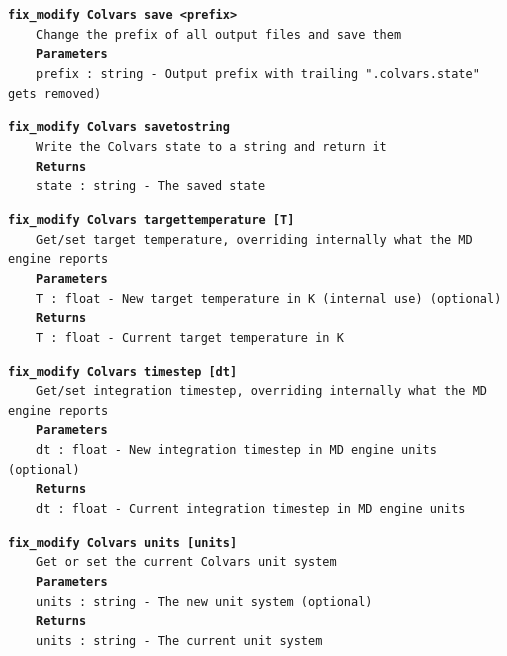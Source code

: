 \begin{mdexampleinput}{}
\texttt{\textbf{fix\_modify Colvars save <prefix>}}
\\
\-~~~~\texttt{Change the prefix of all output files and save them}
\\
\-~~~~\texttt{\textbf{Parameters}}
\\
\-~~~~\texttt{prefix : string - Output prefix with trailing ".colvars.state" gets removed)}
\end{mdexampleinput}
\begin{mdexampleinput}{}
\texttt{\textbf{fix\_modify Colvars savetostring}}
\\
\-~~~~\texttt{Write the Colvars state to a string and return it}
\\
\-~~~~\texttt{\textbf{Returns}}
\\
\-~~~~\texttt{state : string - The saved state}
\end{mdexampleinput}
\begin{mdexampleinput}{}
\texttt{\textbf{fix\_modify Colvars targettemperature [T]}}
\\
\-~~~~\texttt{Get/set target temperature, overriding internally what the MD engine reports}
\\
\-~~~~\texttt{\textbf{Parameters}}
\\
\-~~~~\texttt{T : float - New target temperature in K (internal use) (optional)}
\\
\-~~~~\texttt{\textbf{Returns}}
\\
\-~~~~\texttt{T : float - Current target temperature in K}
\end{mdexampleinput}
\begin{mdexampleinput}{}
\texttt{\textbf{fix\_modify Colvars timestep [dt]}}
\\
\-~~~~\texttt{Get/set integration timestep, overriding internally what the MD engine reports}
\\
\-~~~~\texttt{\textbf{Parameters}}
\\
\-~~~~\texttt{dt : float - New integration timestep in MD engine units (optional)}
\\
\-~~~~\texttt{\textbf{Returns}}
\\
\-~~~~\texttt{dt : float - Current integration timestep in MD engine units}
\end{mdexampleinput}
\begin{mdexampleinput}{}
\texttt{\textbf{fix\_modify Colvars units [units]}}
\\
\-~~~~\texttt{Get or set the current Colvars unit system}
\\
\-~~~~\texttt{\textbf{Parameters}}
\\
\-~~~~\texttt{units : string - The new unit system (optional)}
\\
\-~~~~\texttt{\textbf{Returns}}
\\
\-~~~~\texttt{units : string - The current unit system}
\end{mdexampleinput}
